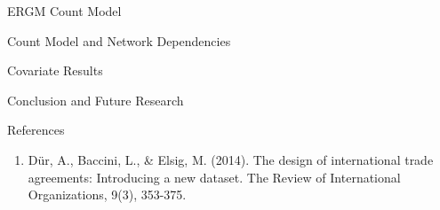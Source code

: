 \documentclass{beamer}
\begin{document}
\begin{frame}{ERGM Count Model}








\end{frame}


\begin{frame}{Count Model and Network Dependencies}


\end{frame}



\begin{frame}{Covariate Results}


\end{frame}


\begin{frame}{Conclusion and Future Research}

\end{frame}


\begin{frame}{References}
\begin{enumerate}
\item{D{\"u}r, A., Baccini, L., \& Elsig, M. (2014). The design of international trade agreements: Introducing a new dataset. The Review of International Organizations, 9(3), 353-375.}
\end{enumerate}
\end{frame}
\end{document}
